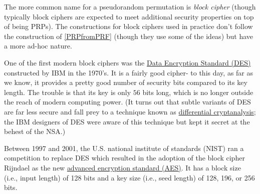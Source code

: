 \hypertarget{feistelrounds}{}

The more common name for a pseudorandom permutation is \emph{block
cipher} (though typically block ciphers are expected to meet additional
security properties on top of being PRPs). The constructions for block
ciphers used in practice don't follow the construction of
\cref{PRPfromPRF} (though they use some of the ideas) but have a more
ad-hoc nature.

One of the first modern block ciphers was the
\href{https://goo.gl/XiCvjs}{Data Encryption Standard (DES)} constructed
by IBM in the 1970's. It is a fairly good cipher- to this day, as far as
we know, it provides a pretty good number of security bits compared to
its key length. The trouble is that its key is only \(56\) bits long,
which is no longer outside the reach of modern computing power. (It
turns out that subtle variants of DES are far less secure and fall prey
to a technique known as \href{https://goo.gl/GAvbh8}{differential
cryptanalysis}; the IBM designers of DES were aware of this technique
but kept it secret at the behest of the NSA.)

Between 1997 and 2001, the U.S. national institute of standards (NIST)
ran a competition to replace DES which resulted in the adoption of the
block cipher Rijndael as the new \href{https://goo.gl/1HnqFb}{advanced
encryption standard (AES)}. It has a block size (i.e., input length) of
128 bits and a key size (i.e., seed length) of 128, 196, or 256 bits.

